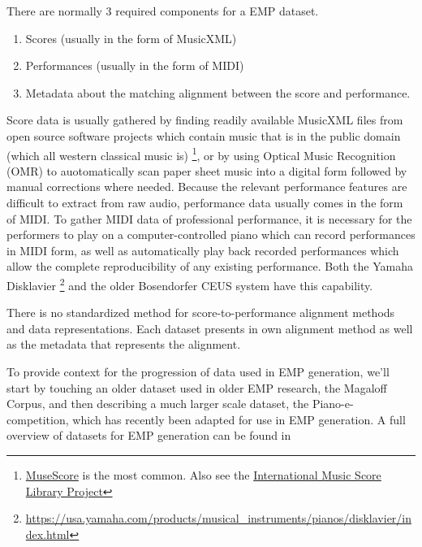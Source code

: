 There are normally 3 required components for a EMP dataset. 
\begin{enumerate}
    \item Scores (usually in the form of MusicXML)
    \item Performances (usually in the form of MIDI)
    \item Metadata about the matching alignment between the score and performance. 
\end{enumerate}
Score data is usually gathered by finding readily available MusicXML files from open source software projects which contain music that is in the public domain (which all western classical music is) \footnote{\href{https://musescore.com}{MuseScore} is the most common. Also see the \href{https://imslp.org/wiki/Main_Page}{International Music Score Library Project}}, or by using Optical Music Recognition (OMR) to auotomatically scan paper sheet music into a digital form followed by manual corrections where needed. Because the relevant performance features are difficult to extract from raw audio, performance data usually comes in the form of MIDI. To gather MIDI data of professional performance, it is necessary for the performers to play on a computer-controlled piano which can record performances in MIDI form, as well as automatically play back recorded performances which allow the complete reproducibility of any existing performance. Both the Yamaha Disklavier \footnote{\url{https://usa.yamaha.com/products/musical_instruments/pianos/disklavier/index.html}} and the older Bosendorfer CEUS system have this capability. 

There is no standardized method for score-to-performance alignment methods and data representations. Each dataset presents in own alignment method as well as the metadata that represents the alignment. 

To provide context for the progression of data used in EMP generation, we'll start by touching an older dataset used in older EMP research, the Magaloff Corpus, and then describing a much larger scale dataset, the Piano-e-competition, which has recently been adapted for use in EMP generation. A full overview of datasets for EMP generation can be found in \cite{cancino2018computational}

